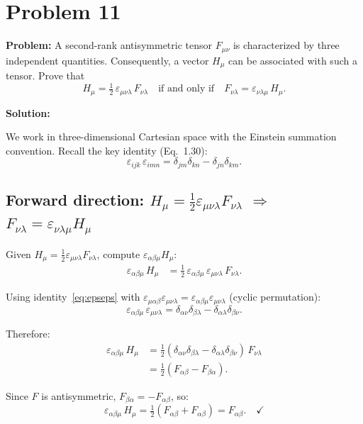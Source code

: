 \documentclass[12pt]{article}
\begin{document}
\section*{Problem 11}

\textbf{Problem:} A second-rank antisymmetric tensor $F_{\mu\nu}$ is characterized by three independent quantities. Consequently, a vector $H_\mu$ can be associated with such a tensor. Prove that
\[
H_\mu = \tfrac{1}{2}\,\varepsilon_{\mu\nu\lambda}\,F_{\nu\lambda}
\quad \text{if and only if} \quad
F_{\nu\lambda} = \varepsilon_{\nu\lambda\mu}\,H_\mu.
\]

\bigskip
\textbf{Solution:}

We work in three-dimensional Cartesian space with the Einstein summation convention. Recall the key identity (Eq.~1.30):
\begin{equation}
\varepsilon_{ijk}\,\varepsilon_{imn} = \delta_{jm}\delta_{kn} - \delta_{jn}\delta_{km}. \label{eq:epseps}
\end{equation}

\subsection*{Forward direction: $H_\mu = \tfrac{1}{2}\varepsilon_{\mu\nu\lambda}F_{\nu\lambda}$ $\Longrightarrow$ $F_{\nu\lambda} = \varepsilon_{\nu\lambda\mu}H_\mu$}

Given $H_\mu = \tfrac{1}{2}\varepsilon_{\mu\nu\lambda}F_{\nu\lambda}$, compute $\varepsilon_{\alpha\beta\mu}H_\mu$:
\begin{align}
\varepsilon_{\alpha\beta\mu}\,H_\mu &= \tfrac{1}{2}\,\varepsilon_{\alpha\beta\mu}\,\varepsilon_{\mu\nu\lambda}\,F_{\nu\lambda}.
\end{align}

Using identity~\eqref{eq:epseps} with $\varepsilon_{\mu\alpha\beta}\varepsilon_{\mu\nu\lambda} = \varepsilon_{\alpha\beta\mu}\varepsilon_{\mu\nu\lambda}$ (cyclic permutation):
\[
\varepsilon_{\alpha\beta\mu}\,\varepsilon_{\mu\nu\lambda} = \delta_{\alpha\nu}\delta_{\beta\lambda} - \delta_{\alpha\lambda}\delta_{\beta\nu}.
\]

Therefore:
\begin{align}
\varepsilon_{\alpha\beta\mu}\,H_\mu &= \tfrac{1}{2}(\delta_{\alpha\nu}\delta_{\beta\lambda} - \delta_{\alpha\lambda}\delta_{\beta\nu})\,F_{\nu\lambda} \\
&= \tfrac{1}{2}(F_{\alpha\beta} - F_{\beta\alpha}).
\end{align}

Since $F$ is antisymmetric, $F_{\beta\alpha} = -F_{\alpha\beta}$, so:
\[
\varepsilon_{\alpha\beta\mu}\,H_\mu = \tfrac{1}{2}(F_{\alpha\beta} + F_{\alpha\beta}) = F_{\alpha\beta}. \quad \checkmark
\]
\end{document}
